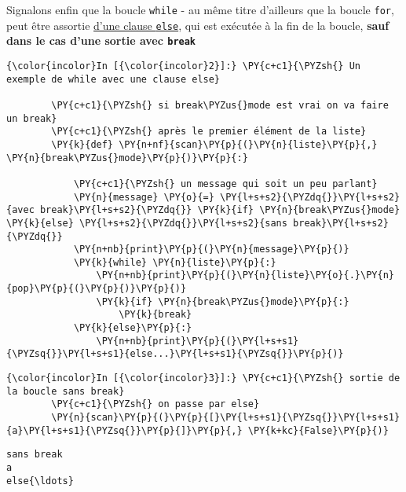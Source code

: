     Signalons enfin que la boucle \texttt{while} - au même titre d'ailleurs
que la boucle \texttt{for}, peut être assortie
\href{https://docs.python.org/3/reference/compound_stmts.html\#the-while-statement}{d'une
clause \texttt{else}}, qui est exécutée à la fin de la boucle,
\textbf{sauf dans le cas d'une sortie avec \texttt{break}}

    \begin{Verbatim}[commandchars=\\\{\},frame=single,framerule=0.3mm,rulecolor=\color{cellframecolor}]
{\color{incolor}In [{\color{incolor}2}]:} \PY{c+c1}{\PYZsh{} Un exemple de while avec une clause else}
        
        \PY{c+c1}{\PYZsh{} si break\PYZus{}mode est vrai on va faire un break}
        \PY{c+c1}{\PYZsh{} après le premier élément de la liste}
        \PY{k}{def} \PY{n+nf}{scan}\PY{p}{(}\PY{n}{liste}\PY{p}{,} \PY{n}{break\PYZus{}mode}\PY{p}{)}\PY{p}{:}
        
            \PY{c+c1}{\PYZsh{} un message qui soit un peu parlant}
            \PY{n}{message} \PY{o}{=} \PY{l+s+s2}{\PYZdq{}}\PY{l+s+s2}{avec break}\PY{l+s+s2}{\PYZdq{}} \PY{k}{if} \PY{n}{break\PYZus{}mode} \PY{k}{else} \PY{l+s+s2}{\PYZdq{}}\PY{l+s+s2}{sans break}\PY{l+s+s2}{\PYZdq{}}
            \PY{n+nb}{print}\PY{p}{(}\PY{n}{message}\PY{p}{)}
            \PY{k}{while} \PY{n}{liste}\PY{p}{:}
                \PY{n+nb}{print}\PY{p}{(}\PY{n}{liste}\PY{o}{.}\PY{n}{pop}\PY{p}{(}\PY{p}{)}\PY{p}{)}
                \PY{k}{if} \PY{n}{break\PYZus{}mode}\PY{p}{:}
                    \PY{k}{break}
            \PY{k}{else}\PY{p}{:}
                \PY{n+nb}{print}\PY{p}{(}\PY{l+s+s1}{\PYZsq{}}\PY{l+s+s1}{else...}\PY{l+s+s1}{\PYZsq{}}\PY{p}{)}
\end{Verbatim}


    \begin{Verbatim}[commandchars=\\\{\},frame=single,framerule=0.3mm,rulecolor=\color{cellframecolor}]
{\color{incolor}In [{\color{incolor}3}]:} \PY{c+c1}{\PYZsh{} sortie de la boucle sans break}
        \PY{c+c1}{\PYZsh{} on passe par else}
        \PY{n}{scan}\PY{p}{(}\PY{p}{[}\PY{l+s+s1}{\PYZsq{}}\PY{l+s+s1}{a}\PY{l+s+s1}{\PYZsq{}}\PY{p}{]}\PY{p}{,} \PY{k+kc}{False}\PY{p}{)}
\end{Verbatim}


    \begin{Verbatim}[commandchars=\\\{\},frame=single,framerule=0.3mm,rulecolor=\color{cellframecolor}]
sans break
a
else{\ldots}
\end{Verbatim}

